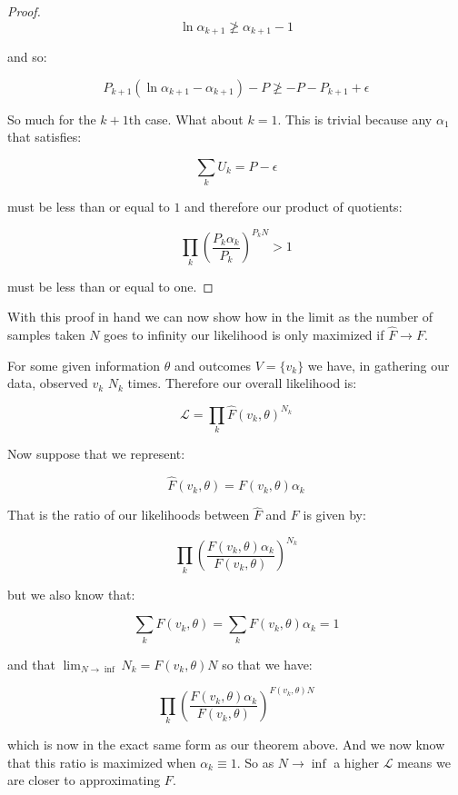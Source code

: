 \documentclass[11pt]{article}
\begin{document}
\begin{proof}
$$\ln \alpha_{k+1} \not\ge \alpha_{k+1}-1$$

and so:

$$P_{k+1}\left(\ln \alpha_{k+1} - \alpha_{k+1}\right) - P \not\ge -P - P_{k+1} + \epsilon$$

So much for the $k+1$th case. What about $k=1$. This is trivial because any $\alpha_1$ that satisfies:

$$\sum_k U_k = P-\epsilon$$

must be less than or equal to $1$ and therefore our product of quotients:

$$\prod_k \left(\frac{P_k\alpha_k}{P_k}\right)^{P_kN}>1$$

must be less than or equal to one. 

\end{proof}


With this proof in hand we can now show how in the limit as the number of samples taken $N$ goes to infinity our likelihood is only maximized if $\hat{F} \rightarrow F$. \newline

For some given information $\theta$ and outcomes $V=\lbrace v_k \rbrace$ we have, in gathering our data, observed $v_k$ $N_k$ times. Therefore our overall likelihood is:

$$\mathcal{L} = \prod_k \hat{F}(v_k, \theta)^{N_k}$$

Now suppose that we represent:

$$\hat{F}(v_k, \theta)=F(v_k, \theta)\alpha_k$$

That is the ratio of our likelihoods between $\hat{F}$ and $F$ is given by:

$$\prod_k \left(\frac{F(v_k, \theta)\alpha_k}{F(v_k, \theta)}\right)^{N_k}$$

but we also know that:

$$\sum_k F(v_k, \theta) = \sum_k F(v_k, \theta)\alpha_k = 1$$

and that $\lim_{N\rightarrow \inf}N_k = F(v_k, \theta)N$ so that we have:

$$\prod_k \left(\frac{F(v_k, \theta)\alpha_k}{F(v_k, \theta)}\right)^{F(v_k, \theta)N}$$

which is now in the exact same form as our theorem above. And we now know that this ratio is maximized when $\alpha_k\equiv 1$. So as $N\rightarrow \inf$ a higher $\mathcal{L}$ means we are closer to approximating $F$. 
\end{document}
